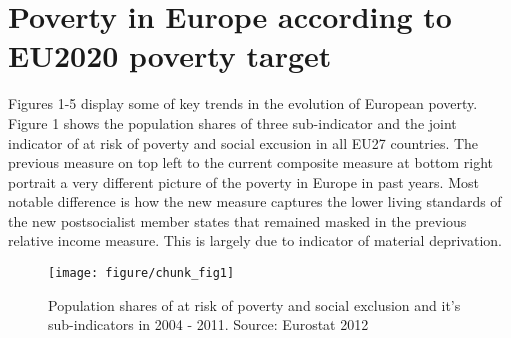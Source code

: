 \documentclass[11pt, a4paper]{article}\usepackage{graphicx, color}
\makeatletter
\def\maxwidth{ %
  \ifdim\Gin@nat@width>\linewidth
    \linewidth
  \else
    \Gin@nat@width
  \fi
}
\newenvironment{knitrout}{}{} %
\makeatother
\begin{document}
\newpage
\section{Poverty in Europe according to EU2020 poverty target}

Figures 1-5 display some of key trends in the evolution of European poverty. Figure 1 shows the  population shares of three sub-indicator and the joint indicator of at risk of poverty and social excusion in all EU27 countries. The previous measure on top left to the current composite measure at bottom right portrait a very different picture of the poverty in Europe in past years. Most notable difference is how the new measure captures the lower living standards of the new postsocialist member states that remained masked in the previous relative income measure. This is largely due to indicator of material deprivation.  

\begin{knitrout}
\color{fgcolor}\begin{figure}[H]
\texttt{[image: figure/chunk\_fig1]} \caption[Population shares of at risk of poverty and social exclusion and it's sub-indicators in 2004 - 2011]{Population shares of at risk of poverty and social exclusion and it's sub-indicators in 2004 - 2011. Source: Eurostat 2012\label{fig:chunk_fig1}}
\end{figure}

\end{knitrout}



\end{document}
